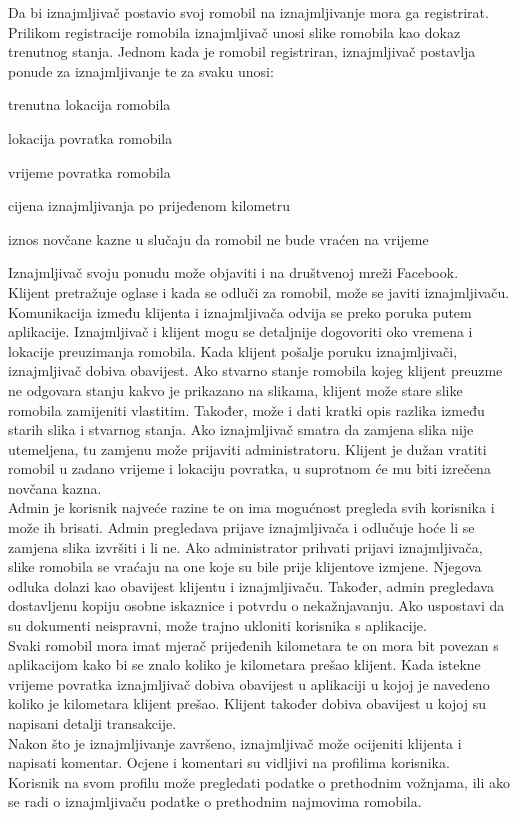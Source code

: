 		\indent Da bi iznajmljivač postavio svoj romobil na iznajmljivanje mora ga registrirat. Prilikom registracije romobila iznajmljivač unosi slike romobila kao dokaz trenutnog stanja. Jednom kada je romobil registriran, iznajmljivač postavlja ponude za iznajmljivanje te za svaku unosi:
		\begin{packed_item} 
			\item trenutna lokacija romobila
			\item lokacija povratka romobila
			\item vrijeme povratka romobila
			\item cijena iznajmljivanja po prijeđenom kilometru
			\item iznos novčane kazne u slučaju da romobil ne bude vraćen na vrijeme
		\end{packed_item}
		Iznajmljivač svoju ponudu može objaviti i na društvenoj mreži Facebook.\\
		\indent Klijent pretražuje oglase i kada se odluči za romobil, može se javiti iznajmljivaču. Komunikacija između klijenta i iznajmljivača odvija se preko poruka putem aplikacije. Iznajmljivač i klijent mogu se detaljnije dogovoriti oko vremena i lokacije preuzimanja romobila. Kada klijent pošalje poruku iznajmljivači, iznajmljivač dobiva obavijest. Ako stvarno stanje romobila kojeg klijent preuzme ne odgovara stanju kakvo je prikazano na slikama, klijent može stare slike romobila zamijeniti vlastitim. Također, može i dati kratki opis razlika između starih slika i stvarnog stanja. Ako iznajmljivač smatra da zamjena slika nije utemeljena, tu zamjenu može prijaviti administratoru. Klijent je dužan vratiti romobil u zadano vrijeme i lokaciju povratka, u suprotnom će mu biti izrečena novčana kazna.  \\
		\indent Admin je korisnik najveće razine te on ima mogućnost pregleda svih korisnika i može ih brisati. Admin pregledava prijave iznajmljivača i odlučuje hoće li se zamjena slika izvršiti i li ne. Ako administrator prihvati prijavi iznajmljivača, slike romobila se vraćaju na one koje su bile prije klijentove izmjene. Njegova odluka dolazi kao obavijest klijentu i iznajmljivaču. Također, admin pregledava dostavljenu kopiju osobne iskaznice i potvrdu o nekažnjavanju. Ako uspostavi da su dokumenti neispravni, može trajno ukloniti korisnika s aplikacije.\\
		\indent Svaki romobil mora imat mjerač prijeđenih kilometara te on mora bit povezan s aplikacijom kako bi se znalo koliko je kilometara prešao klijent. Kada istekne vrijeme povratka iznajmljivač dobiva obavijest u aplikaciji u kojoj je navedeno koliko je kilometara klijent prešao. Klijent također dobiva obavijest u kojoj su napisani detalji transakcije. \\
		\indent Nakon što je iznajmljivanje završeno, iznajmljivač može ocijeniti klijenta i napisati komentar. Ocjene i komentari su vidljivi na profilima korisnika. \\
		\indent Korisnik na svom profilu može pregledati podatke o prethodnim vožnjama, ili ako se radi o iznajmljivaču podatke o prethodnim najmovima romobila.\\ \\
		
